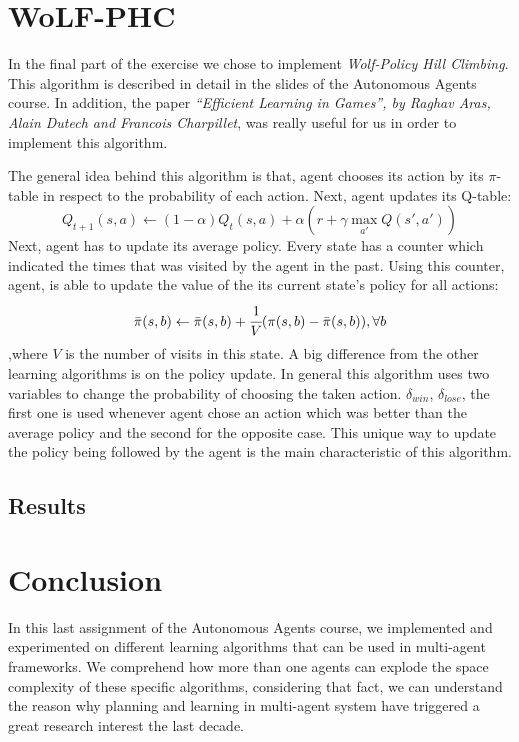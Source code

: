 \documentclass[a4paper,11pt]{article}
\begin{document}
\section{WoLF-PHC}
In the final part of the exercise we chose to implement \textit{Wolf-Policy Hill Climbing}. This algorithm is described in detail in the slides of the Autonomous Agents course. In addition, the paper \textit{``Efficient Learning in Games'', by Raghav Aras, Alain Dutech and Francois Charpillet}, was really useful for us in order to implement this algorithm.

The general idea behind this algorithm is that, agent chooses its action by its $\pi$-table in respect to the probability of each action. Next, agent updates its Q-table:
\[
Q_{t+1}(s,a) \leftarrow (1-\alpha)Q_{t}(s,a)+\alpha(r + \gamma \max_{a'}Q(s',a'))
\]
Next, agent has to update its average policy. Every state has a counter which indicated the times that was visited by the agent in the past. Using this counter, agent, is able to update the value of the its current state's policy for all actions:
\[
\bar{\pi}(s,b) \leftarrow \bar{\pi}(s,b) + \cfrac{1}{V} (\pi(s,b) - \bar{\pi}(s,b)), \forall b
\]
,where $V$ is the number of visits in this state. A big difference from the other learning algorithms is on the policy update. In general this algorithm uses two variables to change the probability of choosing the taken action. $\delta_{win}$, $\delta_{lose}$, the first one is used whenever agent chose an action which was better than the average policy and the second for the opposite case. This unique way to update the policy being followed by the agent is the main characteristic of this algorithm.
\subsection{Results}

\section{Conclusion}
In this last assignment of the Autonomous Agents course, we implemented and experimented on different learning algorithms that can be used in multi-agent frameworks. We comprehend how more than one agents can explode the space complexity of these specific algorithms, considering that fact, we can understand the reason why planning and learning in multi-agent system have triggered a great research interest the last decade.
\end{document}
